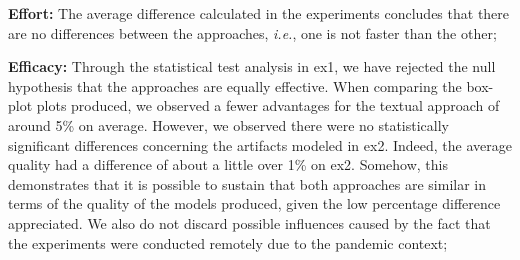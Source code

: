 \begin{description}
    \item \textbf{Effort:} The average difference calculated in the experiments concludes that there are no differences between the approaches, \textit{i.e.}, one is not faster than the other;
    
    \item \textbf{Efficacy:} Through the statistical test analysis in \ac{ex1}, we have rejected the null hypothesis that the approaches are equally effective.
    When comparing the box-plot plots produced, we observed a fewer advantages for the textual approach of around 5\% on average.
    However, we observed there were no statistically significant differences concerning the artifacts modeled in \ac{ex2}.
    Indeed, the average quality had a difference of about a little over 1\% on \ac{ex2}.
    Somehow, this demonstrates that it is possible to sustain that both approaches are similar in terms of the quality of the models produced, given the low percentage difference appreciated.
    We also do not discard possible influences caused by the fact that the experiments were conducted remotely due to the pandemic context;
    

\end{description}
